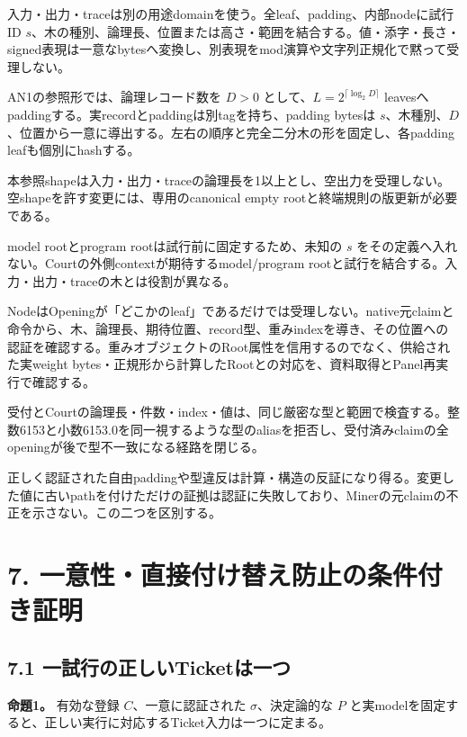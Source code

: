 \documentclass[
  10pt,
]{article}
\begin{document}
入力・出力・traceは別の用途domainを使う。全leaf、padding、内部nodeに試行ID
\(s\)、木の種別、論理長、位置または高さ・範囲を結合する。値・添字・長さ・signed表現は一意なbytesへ変換し、別表現をmod演算や文字列正規化で黙って受理しない。

AN1の参照形では、論理レコード数を \(D>0\)
として、\(L=2^{\lceil\log_2D\rceil}\)
leavesへpaddingする。実recordとpaddingは別tagを持ち、padding bytesは
\(s\)、木種別、\(D\)、位置から一意に導出する。左右の順序と完全二分木の形を固定し、各padding
leafも個別にhashする。

本参照shapeは入力・出力・traceの論理長を1以上とし、空出力を受理しない。空shapeを許す変更には、専用のcanonical
empty rootと終端規則の版更新が必要である。

model rootとprogram rootは試行前に固定するため、未知の \(s\)
をその定義へ入れない。Courtの外側contextが期待するmodel/program
rootと試行を結合する。入力・出力・traceの木とは役割が異なる。

NodeはOpeningが「どこかのleaf」であるだけでは受理しない。native元claimと命令から、木、論理長、期待位置、record型、重みindexを導き、その位置への認証を確認する。重みオブジェクトのRoot属性を信用するのでなく、供給された実weight
bytes・正規形から計算したRootとの対応を、資料取得とPanel再実行で確認する。

受付とCourtの論理長・件数・index・値は、同じ厳密な型と範囲で検査する。整数6153と小数6153.0を同一視するような型のaliasを拒否し、受付済みclaimの全openingが後で型不一致になる経路を閉じる。

正しく認証された自由paddingや型違反は計算・構造の反証になり得る。変更した値に古いpathを付けただけの証拠は認証に失敗しており、Minerの元claimの不正を示さない。この二つを区別する。

\section{7.
一意性・直接付け替え防止の条件付き証明}\label{ux4e00ux610fux6027ux76f4ux63a5ux4ed8ux3051ux66ffux3048ux9632ux6b62ux306eux6761ux4ef6ux4ed8ux304dux8a3cux660e}

\subsection{7.1
一試行の正しいTicketは一つ}\label{ux4e00ux8a66ux884cux306eux6b63ux3057ux3044ticketux306fux4e00ux3064}

\textbf{命題1。} 有効な登録 \(C\)、一意に認証された
\(\sigma\)、決定論的な \(P\)
と実modelを固定すると、正しい実行に対応するTicket入力は一つに定まる。
\end{document}
